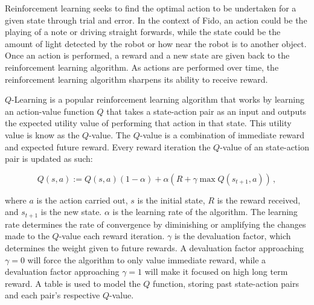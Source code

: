 Reinforcement learning seeks to find the optimal action to be undertaken for a given state through trial and error. In the context of Fido, an action could be the playing of a note or driving straight forwards, while the state could be the amount of light detected by the robot or how near the robot is to another object. Once an action is performed, a reward and a new state are given back to the reinforcement learning algorithm.  As actions are performed over time, the reinforcement learning algorithm sharpens its ability to receive reward.

$Q$-Learning \cite{watkins} is a popular reinforcement learning algorithm that works by learning an action-value function $Q$ that takes a state-action pair as an input and outputs the expected utility value of performing that action in that state. This utility value is know as the $Q$-value. The $Q$-value is a combination of immediate reward and expected future reward. Every reward iteration the $Q$-value of an state-action pair is updated as such:

\begin{equation}
	Q(s, a) := Q(s, a)(1 - \alpha) + \alpha(R + \gamma \max Q(s_{t+1}, a))
	\,,
	\label{equ::updateqlearn}
\end{equation}

\noindent
where $a$ is the action carried out, $s$ is the initial state, $R$ is the reward received, and $s_{t+1}$ is the new state. $\alpha$ is the learning rate of the algorithm. The learning rate determines the rate of convergence by diminishing or amplifying the changes made to the $Q$-value each reward iteration. $\gamma$ is the devaluation factor, which determines the weight given to future rewards. A devaluation factor approaching $\gamma=0$ will force the algorithm to only value immediate reward, while a devaluation factor approaching $\gamma=1$ will make it focused on high long term reward.  A table is used to model the $Q$ function, storing past state-action pairs and each pair's respective $Q$-value.

